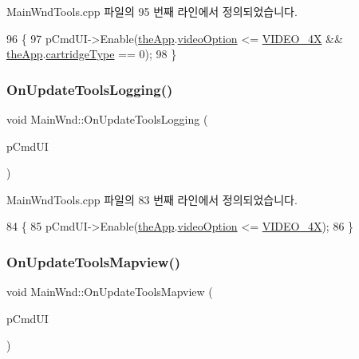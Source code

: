 Main\+Wnd\+Tools.\+cpp 파일의 95 번째 라인에서 정의되었습니다.


\begin{DoxyCode}
96 \{
97   pCmdUI->Enable(\mbox{\hyperlink{_v_b_a_8cpp_a8095a9d06b37a7efe3723f3218ad8fb3}{theApp}}.\mbox{\hyperlink{class_v_b_a_a17dac073149c897f770c00ed7098ad32}{videoOption}} <= \mbox{\hyperlink{_v_b_a_8h_a531c35e38ede3ea4e5ba5afb24b29493a6468bce6b84e6350d3de126f257eb38d}{VIDEO\_4X}} && 
      \mbox{\hyperlink{_v_b_a_8cpp_a8095a9d06b37a7efe3723f3218ad8fb3}{theApp}}.\mbox{\hyperlink{class_v_b_a_af300759fcbc7eeb00ce73f956fc5ddb7}{cartridgeType}} == 0);
98 \}
\end{DoxyCode}
\mbox{\label{class_main_wnd_a304d0e3ec18ccd207ddaf1effc9019b0}} 
\subsubsection{\texorpdfstring{On\+Update\+Tools\+Logging()}{OnUpdateToolsLogging()}}
{\footnotesize\ttfamily void Main\+Wnd\+::\+On\+Update\+Tools\+Logging (\begin{DoxyParamCaption}\item[{C\+Cmd\+UI $\ast$}]{p\+Cmd\+UI }\end{DoxyParamCaption})\hspace{0.3cm}{\ttfamily [protected]}}



Main\+Wnd\+Tools.\+cpp 파일의 83 번째 라인에서 정의되었습니다.


\begin{DoxyCode}
84 \{
85   pCmdUI->Enable(\mbox{\hyperlink{_v_b_a_8cpp_a8095a9d06b37a7efe3723f3218ad8fb3}{theApp}}.\mbox{\hyperlink{class_v_b_a_a17dac073149c897f770c00ed7098ad32}{videoOption}} <= \mbox{\hyperlink{_v_b_a_8h_a531c35e38ede3ea4e5ba5afb24b29493a6468bce6b84e6350d3de126f257eb38d}{VIDEO\_4X}});
86 \}
\end{DoxyCode}
\mbox{\label{class_main_wnd_a2a5c40477c6841deb29e03e5fb0c6b5b}} 
\subsubsection{\texorpdfstring{On\+Update\+Tools\+Mapview()}{OnUpdateToolsMapview()}}
{\footnotesize\ttfamily void Main\+Wnd\+::\+On\+Update\+Tools\+Mapview (\begin{DoxyParamCaption}\item[{C\+Cmd\+UI $\ast$}]{p\+Cmd\+UI }\end{DoxyParamCaption})\hspace{0.3cm}{\ttfamily [protected]}}



